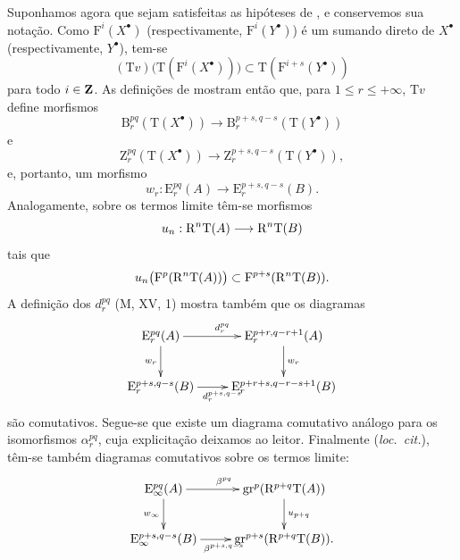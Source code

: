 \begin{env}[13.6.5]
\label{0.13.6.5}
Suponhamos agora que sejam satisfeitas as hipóteses de , e
conservemos sua notação.
Como $\mathrm{F}^i(X^\bullet)$ (respectivamente,
$\mathrm{F}^i(Y^\bullet)$) é um sumando direto de $X^\bullet$
(respectivamente, $Y^\bullet$), tem-se
\[
  (\mathrm{T}v)\bigl(\mathrm{T}(\mathrm{F}^i(X^\bullet))\bigr)
  \subset
  \mathrm{T}(\mathrm{F}^{i+s}(Y^\bullet))
\]
para todo $i\in\mathbf{Z}$.
As definições de  mostram então que, para
$1\leq r\leq+\infty$, $\mathrm{T}v$ define morfismos
\[
  \mathrm{B}_r^{pq}(\mathrm{T}(X^\bullet))
  \longrightarrow
  \mathrm{B}_r^{p+s,q-s}(\mathrm{T}(Y^\bullet))
\]
e
\[
  \mathrm{Z}_r^{pq}(\mathrm{T}(X^\bullet))
  \longrightarrow
  \mathrm{Z}_r^{p+s,q-s}(\mathrm{T}(Y^\bullet)),
\]
e, portanto, um morfismo
\[
  w_r:
  \mathrm{E}_r^{pq}(A)
  \longrightarrow
  \mathrm{E}_r^{p+s,q-s}(B).
\]
Analogamente, sobre os termos limite têm-se morfismos
\[
  u_n:
  \mathrm{R}^n\mathrm{T}(A)
  \longrightarrow
  \mathrm{R}^n\mathrm{T}(B)
\]
tais que
\[
  u_n\bigl(\mathrm{F}^p(\mathrm{R}^n\mathrm{T}(A))\bigr)
  \subset
  \mathrm{F}^{p+s}(\mathrm{R}^n\mathrm{T}(B)).
\]
A definição dos $d_r^{pq}$ (M, XV, 1) mostra também que os
diagramas
\[
  \xymatrix{
    \mathrm{E}_r^{pq}(A)
      \ar[r]^{d_r^{pq}}\ar[d]_{w_r}
    &
    \mathrm{E}_r^{p+r,q-r+1}(A)
      \ar[d]^{w_r}
    \\
    \mathrm{E}_r^{p+s,q-s}(B)
      \ar[r]_{d_r^{p+s,q-s}}
    &
    \mathrm{E}_r^{p+r+s,q-r-s+1}(B)
  }
\]
são comutativos.
Segue-se que existe um diagrama comutativo análogo para os
isomorfismos $\alpha_r^{pq}$, cuja explicitação deixamos ao leitor.
Finalmente (\emph{loc.\ cit.}), têm-se também diagramas comutativos
sobre os termos limite:
\[
  \xymatrix{
    \mathrm{E}_\infty^{pq}(A)
      \ar[r]^{\beta^{pq}}\ar[d]_{w_\infty}
    &
    \mathrm{gr}^p(\RR^{p+q}\mathrm{T}(A))
      \ar[d]^{u_{p+q}}
    \\
    \mathrm{E}_\infty^{p+s,q-s}(B)
      \ar[r]_{\beta^{p+s,q-s}}
    &
    \mathrm{gr}^{p+s}(\RR^{p+q}\mathrm{T}(B)).
  }
\]
\end{env}


